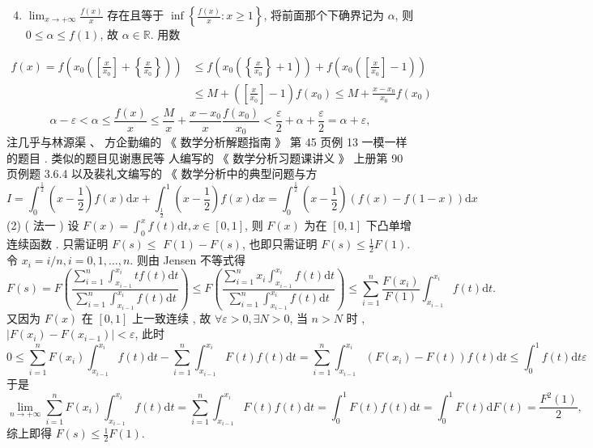 \documentclass[10pt]{article}
\begin{document}
{\begin{enumerate}
  \setcounter{enumi}{3}
  \item $\lim _{x \rightarrow+\infty} \frac{f(x)}{x}$  存在且等于  $\inf \left\{\frac{f(x)}{x}: x \geqslant 1\right\}$,  将前面那个下确界记为  $\alpha$,  则  $0 \leqslant \alpha \leqslant f(1)$,  故  $\alpha \in \mathbb{R}$.  用数 
\end{enumerate}
$$
\begin{aligned}
f(x)=f\left(x_{0}\left(\left[\frac{x}{x_{0}}\right]+\left\{\frac{x}{x_{0}}\right\}\right)\right) & \leqslant f\left(x_{0}\left(\left\{\frac{x}{x_{0}}\right\}+1\right)\right)+f\left(x_{0}\left(\left[\frac{x}{x_{0}}\right]-1\right)\right) \\
& \leqslant M+\left(\left[\frac{x}{x_{0}}\right]-1\right) f\left(x_{0}\right) \leqslant M+\frac{x-x_{0}}{x_{0}} f\left(x_{0}\right)
\end{aligned}
$$
$$
\alpha-\varepsilon<\alpha \leqslant \frac{f(x)}{x} \leqslant \frac{M}{x}+\frac{x-x_{0}}{x} \frac{f\left(x_{0}\right)}{x_{0}}<\frac{\varepsilon}{2}+\alpha+\frac{\varepsilon}{2}=\alpha+\varepsilon,
$$
 注几乎与林源渠 、 方企勤编的 《 数学分析解题指南 》 第  45  页例  13  一模一样的题目 .  类似的题目见谢惠民等   人编写的 《 数学分析习题课讲义 》 上册第  90  页例题  3.6.4  以及裴礼文编写的 《 数学分析中的典型问题与方 
$$
I=\int_{0}^{\frac{1}{2}}\left(x-\frac{1}{2}\right) f(x) \mathrm{d} x+\int_{\frac{1}{2}}^{1}\left(x-\frac{1}{2}\right) f(x) \mathrm{d} x=\int_{0}^{\frac{1}{2}}\left(x-\frac{1}{2}\right)(f(x)-f(1-x)) \mathrm{d} x
$$
(2) ( 法一 )  设  $F(x)=\int_{0}^{x} f(t) \mathrm{d} t, x \in[0,1]$,  则  $F(x)$  为在  $[0,1]$  下凸单增连续函数 .  只需证明  $F(s) \leqslant$ $F(1)-F(s)$,  也即只需证明  $F(s) \leqslant \frac{1}{2} F(1)$.  令  $x_{i}=i / n, i=0,1, \ldots, n$.  则由  Jensen  不等式得 
$$
F(s)=F\left(\frac{\sum_{i=1}^{n} \int_{x_{i-1}}^{x_{i}} t f(t) \mathrm{d} t}{\sum_{i=1}^{n} \int_{x_{i-1}}^{x_{i}} f(t) \mathrm{d} t}\right) \leqslant F\left(\frac{\sum_{i=1}^{n} x_{i} \int_{x_{i-1}}^{x_{i}} f(t) \mathrm{d} t}{\sum_{i=1}^{n} \int_{x_{i-1}}^{x_{i}} f(t) \mathrm{d} t}\right) \leqslant \sum_{i=1}^{n} \frac{F\left(x_{i}\right)}{F(1)} \int_{x_{i-1}}^{x_{i}} f(t) \mathrm{d} t .
$$
 又因为  $F(x)$  在  $[0,1]$  上一致连续 ,  故  $\forall \varepsilon>0, \exists N>0$,  当  $n>N$  时 , $\left|F\left(x_{i}\right)-F\left(x_{i-1}\right)\right|<\varepsilon$,  此时 
$$
0 \leqslant \sum_{i=1}^{n} F\left(x_{i}\right) \int_{x_{i-1}}^{x_{i}} f(t) \mathrm{d} t-\sum_{i=1}^{n} \int_{x_{i-1}}^{x_{i}} F(t) f(t) \mathrm{d} t=\sum_{i=1}^{n} \int_{x_{i-1}}^{x_{i}}\left(F\left(x_{i}\right)-F(t)\right) f(t) \mathrm{d} t \leqslant \int_{0}^{1} f(t) \mathrm{d} t \varepsilon
$$
 于是 
$$
\lim _{n \rightarrow+\infty} \sum_{i=1}^{n} F\left(x_{i}\right) \int_{x_{i-1}}^{x_{i}} f(t) \mathrm{d} t=\sum_{i=1}^{n} \int_{x_{i-1}}^{x_{i}} F(t) f(t) \mathrm{d} t=\int_{0}^{1} F(t) f(t) \mathrm{d} t=\int_{0}^{1} F(t) \mathrm{d} F(t)=\frac{F^{2}(1)}{2},
$$
 综上即得  $F(s) \leqslant \frac{1}{2} F(1)$.

}
\end{document}
